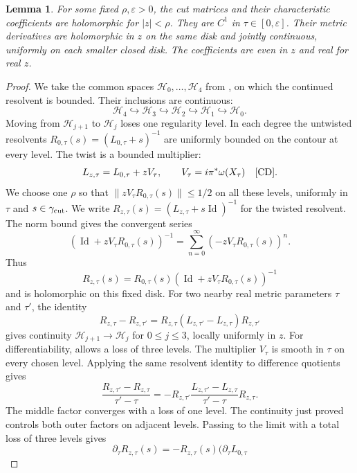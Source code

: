 \documentclass[11pt,letterpaper,reqno]{amsart}
\newtheorem{lemma}[theorem]{Lemma}
\theoremstyle{remark}
\newcommand{\Id}{\operatorname{Id}}
\newcommand{\cH}{\mathcal H}
\begin{document}
\begin{lemma}\label{holom}
For some fixed $\rho,\varepsilon>0$, the cut matrices and their
characteristic coefficients are holomorphic for $|z|<\rho$.
They are $C^1$ in $\tau\in[0,\varepsilon]$. Their metric derivatives
are holomorphic in $z$ on the same disk and jointly continuous,
uniformly on each smaller closed disk.
The coefficients are even in $z$ and real for real $z$.
\end{lemma}
\begin{proof}
We take the common spaces $\cH_0,\ldots,\cH_4$ from
\cite[Appendix B.2--B.6]{CD}, on which the continued resolvent is bounded.
Their inclusions are continuous:
\[
 \cH_4\hookrightarrow\cH_3\hookrightarrow\cH_2
       \hookrightarrow\cH_1\hookrightarrow\cH_0.
\]
Moving from $\cH_{j+1}$ to $\cH_j$ loses one regularity level.
In each degree the untwisted resolvents
$R_{0,\tau}(s)=(L_{0,\tau}+s)^{-1}$ are uniformly bounded on the
contour at every level. The twist is a bounded multiplier:
\[
 L_{z,\tau}=L_{0,\tau}+zV_\tau,
 \qquad V_\tau=i\pi^*\omega(X_\tau)
 \quad\text{\cite[(8.9)]{CD}}.
\]
We choose one $\rho$ so that $\|zV_\tau R_{0,\tau}(s)\|\leq1/2$
on all these levels, uniformly in $\tau$ and $s\in\gamma_{\rm cut}$.
We write $R_{z,\tau}(s)=(L_{z,\tau}+s\Id)^{-1}$ for the twisted
resolvent. The norm bound gives the convergent series
\[
 (\Id+zV_\tau R_{0,\tau}(s))^{-1}
 =\sum_{n=0}^{\infty}(-zV_\tau R_{0,\tau}(s))^n.
\]
Thus
\begin{equation}\label{Neumann}
 R_{z,\tau}(s)=R_{0,\tau}(s)
                  (\Id+zV_\tau R_{0,\tau}(s))^{-1}
\end{equation}
and is holomorphic on this fixed disk. For two nearby real metric
parameters $\tau$ and $\tau'$, the identity
\[
 R_{z,\tau}-R_{z,\tau'}
 =R_{z,\tau}(L_{z,\tau'}-L_{z,\tau})R_{z,\tau'}
\]
gives continuity $\cH_{j+1}\to\cH_j$ for $0\leq j\leq3$,
locally uniformly in $z$.
For differentiability, \cite[Appendix B.5, (B.6)]{CD} allows a loss
of three levels. The multiplier $V_\tau$ is smooth in $\tau$ on every
chosen level. Applying the same resolvent identity to difference
quotients gives
\[
 \frac{R_{z,\tau'}-R_{z,\tau}}{\tau'-\tau}
 =-R_{z,\tau'}
     \frac{L_{z,\tau'}-L_{z,\tau}}{\tau'-\tau}R_{z,\tau}.
\]
The middle factor converges with a loss of one level. The continuity
just proved controls both outer factors on adjacent levels. Passing to
the limit with a total loss of three levels gives
\begin{equation}\label{metricresolvent}
 \partial_\tau R_{z,\tau}(s)
 =-R_{z,\tau}(s)(\partial_\tau L_{0,\tau}

\end{equation}
\end{proof}
\end{document}
